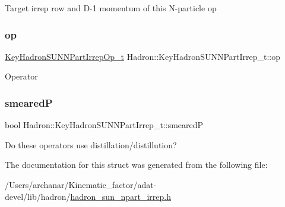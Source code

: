 Target irrep row and D-\/1 momentum of this N-\/particle op \mbox{\label{structHadron_1_1KeyHadronSUNNPartIrrep__t_ae502e15ab768c7d2dd40b79672d0c0b0}} 
\subsubsection{\texorpdfstring{op}{op}}
{\footnotesize\ttfamily \mbox{\hyperlink{structHadron_1_1KeyHadronSUNNPartIrrepOp__t}{Key\+Hadron\+S\+U\+N\+N\+Part\+Irrep\+Op\+\_\+t}} Hadron\+::\+Key\+Hadron\+S\+U\+N\+N\+Part\+Irrep\+\_\+t\+::op}

Operator \mbox{\label{structHadron_1_1KeyHadronSUNNPartIrrep__t_ae27b069e7cc2139fcf1e9e847c163f38}} 
\subsubsection{\texorpdfstring{smearedP}{smearedP}}
{\footnotesize\ttfamily bool Hadron\+::\+Key\+Hadron\+S\+U\+N\+N\+Part\+Irrep\+\_\+t\+::smearedP}

Do these operators use distillation/distillution? 

The documentation for this struct was generated from the following file\+:\begin{DoxyCompactItemize}
\item 
/\+Users/archanar/\+Kinematic\+\_\+factor/adat-\/devel/lib/hadron/\mbox{\hyperlink{adat-devel_2lib_2hadron_2hadron__sun__npart__irrep_8h}{hadron\+\_\+sun\+\_\+npart\+\_\+irrep.\+h}}\end{DoxyCompactItemize}
